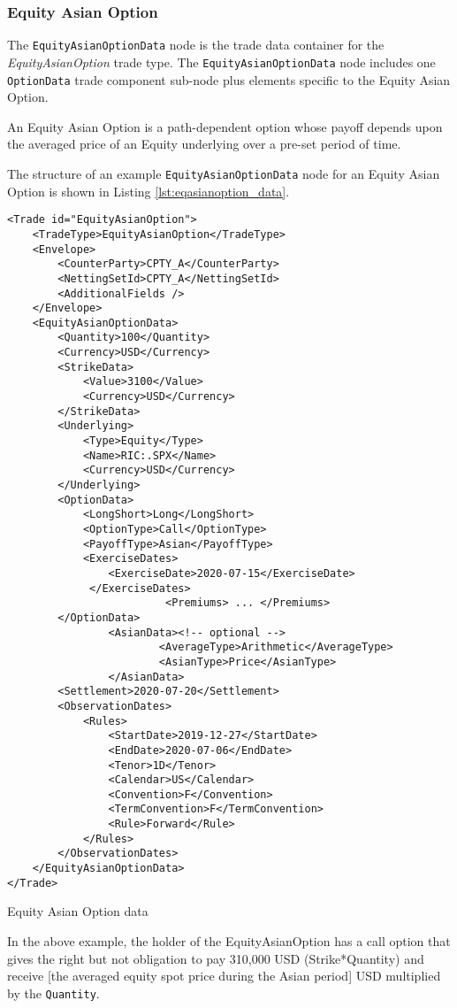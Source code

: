 \subsubsection{Equity Asian Option}

The \lstinline!EquityAsianOptionData!  node is the trade data container for the \emph{EquityAsianOption} trade type. 
The \lstinline!EquityAsianOptionData!  node includes one  \lstinline!OptionData! trade component sub-node plus elements
specific to the Equity Asian Option. 

An Equity Asian Option is a path-dependent option whose payoff depends upon the averaged price of an Equity underlying 
over a pre-set period of time.

The structure of an example \lstinline!EquityAsianOptionData! node for an Equity Asian Option is shown in Listing
\ref{lst:eqasianoption_data}.

\begin{listing}[H]
	\begin{verbatim}
<Trade id="EquityAsianOption">
	<TradeType>EquityAsianOption</TradeType>
	<Envelope>
		<CounterParty>CPTY_A</CounterParty>
		<NettingSetId>CPTY_A</NettingSetId>
		<AdditionalFields />
	</Envelope>
	<EquityAsianOptionData>
		<Quantity>100</Quantity>
		<Currency>USD</Currency>
		<StrikeData>
			<Value>3100</Value>
			<Currency>USD</Currency>
		</StrikeData>
		<Underlying>
			<Type>Equity</Type>
			<Name>RIC:.SPX</Name>
			<Currency>USD</Currency>
		</Underlying>
		<OptionData>
			<LongShort>Long</LongShort>
			<OptionType>Call</OptionType>
			<PayoffType>Asian</PayoffType>
			<ExerciseDates>
				<ExerciseDate>2020-07-15</ExerciseDate>
			 </ExerciseDates>
                         <Premiums> ... </Premiums>       
		</OptionData>
                <AsianData><!-- optional -->
                        <AverageType>Arithmetic</AverageType>
                        <AsianType>Price</AsianType>
                </AsianData>
		<Settlement>2020-07-20</Settlement>
		<ObservationDates>
			<Rules>
				<StartDate>2019-12-27</StartDate>
				<EndDate>2020-07-06</EndDate>
				<Tenor>1D</Tenor>
				<Calendar>US</Calendar>
				<Convention>F</Convention>
				<TermConvention>F</TermConvention>
				<Rule>Forward</Rule>
			</Rules>
		</ObservationDates>
	</EquityAsianOptionData>
</Trade>
\end{verbatim}
\caption{Equity Asian Option data}
\label{lst:eqasianoption_data}
\end{listing}

In the above example, the holder of the EquityAsianOption has a call option that gives the right but not obligation to pay 310,000 USD (Strike*Quantity) and receive [the averaged equity spot price during the Asian period] USD multiplied by the \lstinline!Quantity!.  

